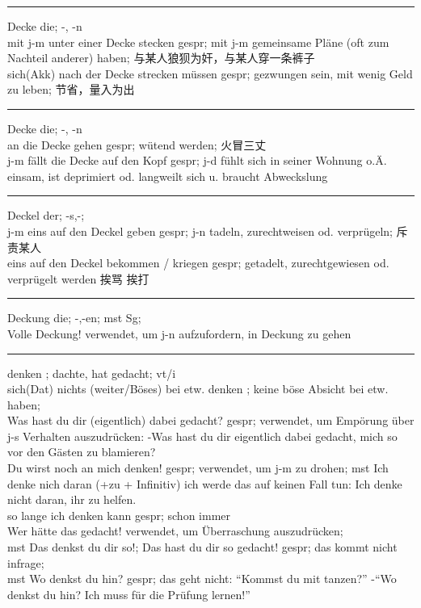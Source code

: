 \noindent\rule{\textwidth}{1pt}
Decke die; -, -n \\
mit j-m unter einer Decke stecken gespr; mit j-m gemeinsame Pl\"ane (oft zum Nachteil anderer) haben; 与某人狼狈为奸，与某人穿一条裤子\\
sich(Akk) nach der Decke strecken m\"ussen gespr; gezwungen sein, mit wenig Geld zu leben; 节省，量入为出 \\

\noindent\rule{\textwidth}{1pt}
Decke die; -, -n \\
an die Decke gehen gespr; w\"utend werden; 火冒三丈 \\
j-m f\"allt die Decke auf den Kopf gespr; j-d f\"uhlt sich in seiner Wohnung o.\"A. einsam, ist deprimiert od. langweilt sich u. braucht Abweckslung \\

\noindent\rule{\textwidth}{1pt}
Deckel der; -s,-; \\
j-m eins auf den Deckel geben gespr; j-n tadeln, zurechtweisen od. verpr\"ugeln; 斥责某人 \\
eins auf den Deckel bekommen / kriegen gespr; getadelt, zurechtgewiesen od. verpr\"ugelt werden 挨骂 挨打\\

\noindent\rule{\textwidth}{1pt}
Deckung die; -,-en; mst Sg; \\
Volle Deckung! verwendet, um j-n aufzufordern, in Deckung zu gehen \\

\noindent\rule{\textwidth}{1pt}
denken ; dachte, hat gedacht; vt/i \\
sich(Dat) nichts (weiter/B\"oses) bei etw. denken ; keine b\"ose Absicht bei etw. haben; \\
Was hast du dir (eigentlich) dabei gedacht? gespr; verwendet, um Emp\"orung \"uber j-s Verhalten auszudr\"ucken: -Was hast du dir eigentlich dabei gedacht, mich so vor den G\"asten zu blamieren? \\
Du wirst noch an mich denken! gespr; verwendet, um j-m zu drohen; mst Ich denke nich daran (+zu + Infinitiv) ich werde das auf keinen Fall tun: Ich denke nicht daran, ihr zu helfen. \\
so lange ich denken kann gespr; schon immer \\
Wer h\"atte das gedacht! verwendet, um \"Uberraschung auszudr\"ucken;\\
mst Das denkst du dir so!; Das hast du dir so gedacht! gespr; das kommt nicht infrage; \\
mst Wo denkst du hin? gespr; das geht nicht: ``Kommst du mit tanzen?'' -``Wo denkst du hin? Ich muss f\"ur die Pr\"ufung lernen!''\\

